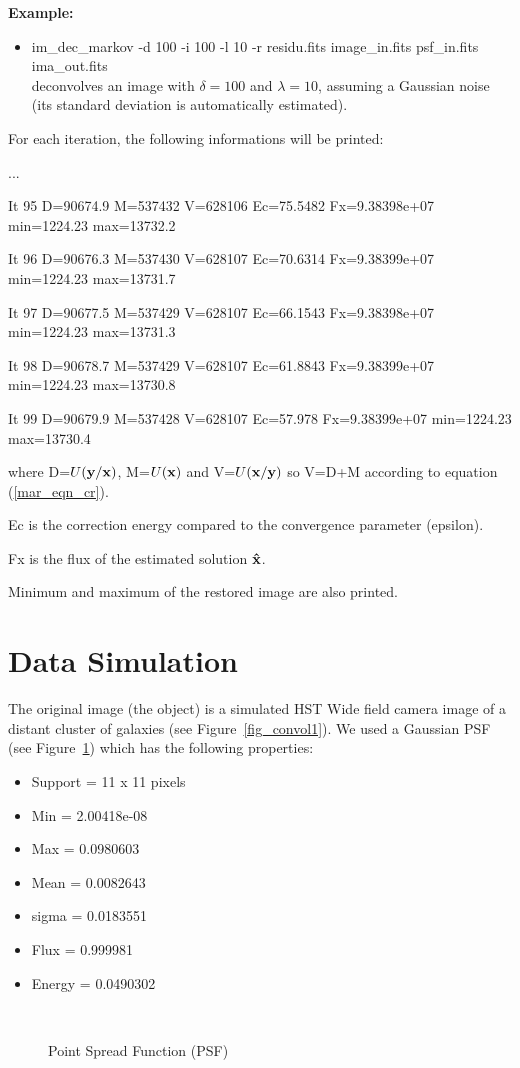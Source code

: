 {\bf Example:}
\begin{itemize}
\item im\_dec\_markov -d 100 -i 100 -l 10 -r residu.fits 
image\_in.fits psf\_in.fits ima\_out.fits \\
deconvolves an image with $\delta=100$ and $\lambda=10$, assuming
a Gaussian noise (its standard deviation is automatically estimated).
\end{itemize}

For each iteration, the following informations will be printed:

...

It 95 D=90674.9 M=537432 V=628106 Ec=75.5482 Fx=9.38398e+07 min=1224.23 max=13732.2

It 96 D=90676.3 M=537430 V=628107 Ec=70.6314 Fx=9.38399e+07 min=1224.23 max=13731.7

It 97 D=90677.5 M=537429 V=628107 Ec=66.1543 Fx=9.38398e+07 min=1224.23 max=13731.3

It 98 D=90678.7 M=537429 V=628107 Ec=61.8843 Fx=9.38399e+07 min=1224.23 max=13730.8

It 99 D=90679.9 M=537428 V=628107 Ec=57.978 Fx=9.38399e+07 min=1224.23 max=13730.4
 
where D=$U({\bf y/x})$, M=$U({\bf x})$ and V=$U({\bf x/y})$ 
so V=D+M according to equation (\ref{mar_eqn_cr}). 

Ec is the correction energy compared
to the convergence parameter (epsilon).

Fx is the flux of the estimated
solution $\bf \hat x$.

Minimum and maximum of the restored image are also printed.

\newpage

\section{Data Simulation}

The original image (the object) is a simulated HST Wide field camera image of 
a distant cluster 
of galaxies (see Figure~\ref{fig_convol1}).
We used a Gaussian PSF (see Figure~\ref{fig_psf}) which has the following properties:
\begin{itemize}
\item{Support = 11 x 11 pixels}
\item{  Min = 2.00418e-08}   
\item{  Max = 0.0980603}
\item{  Mean = 0.0082643} 
\item{  sigma = 0.0183551}
\item{  Flux = 0.999981} 
\item{  Energy = 0.0490302}
\end{itemize}
\begin{figure}[htb]
\centerline{
\hbox{
}}
\caption{Point Spread Function (PSF)}
\label{fig_psf}
\end{figure}

